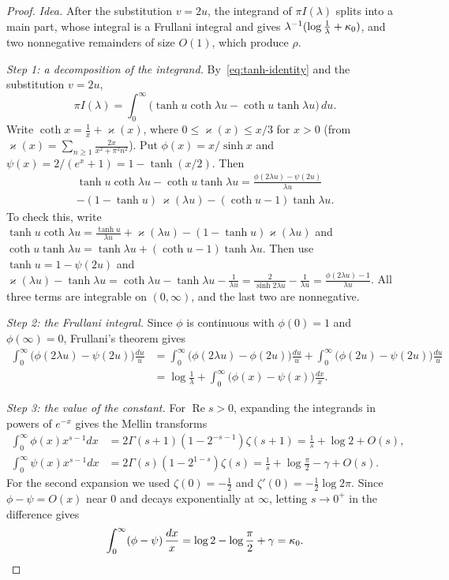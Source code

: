 \begin{proof}
\emph{Idea.} After the substitution $v=2u$, the integrand of $\pi I(\lambda)$ splits into a main part, whose integral is a Frullani integral and gives $\lambda^{-1}(\log\frac1\lambda+\kappa_0)$, and two nonnegative remainders of size $O(1)$, which produce $\rho$.

\emph{Step 1: a decomposition of the integrand.} By~\eqref{eq:tanh-identity} and the substitution $v=2u$,
\[
\pi I(\lambda)=\int_0^\infty\bigl(\tanh u\coth\lambda u-\coth u\tanh\lambda u\bigr)\,du.
\]
Write $\coth x=\frac1x+\varkappa(x)$, where $0\le\varkappa(x)\le x/3$ for $x>0$ (from $\varkappa(x)=\sum_{n\ge1}\frac{2x}{x^2+\pi^2n^2}$). Put $\phi(x)=x/\sinh x$ and $\psi(x)=2/(e^x+1)=1-\tanh(x/2)$. Then
\begin{multline*}
\tanh u\coth\lambda u-\coth u\tanh\lambda u
=\frac{\phi(2\lambda u)-\psi(2u)}{\lambda u}\\
-(1-\tanh u)\,\varkappa(\lambda u)-(\coth u-1)\tanh\lambda u.
\end{multline*}
To check this, write $\tanh u\coth\lambda u=\frac{\tanh u}{\lambda u}+\varkappa(\lambda u)-(1-\tanh u)\varkappa(\lambda u)$ and $\coth u\tanh\lambda u=\tanh\lambda u+(\coth u-1)\tanh\lambda u$. Then use $\tanh u=1-\psi(2u)$ and $\varkappa(\lambda u)-\tanh\lambda u=\coth\lambda u-\tanh\lambda u-\frac1{\lambda u}=\frac2{\sinh2\lambda u}-\frac1{\lambda u}=\frac{\phi(2\lambda u)-1}{\lambda u}$. All three terms are integrable on $(0,\infty)$, and the last two are nonnegative.

\emph{Step 2: the Frullani integral.} Since $\phi$ is continuous with $\phi(0)=1$ and $\phi(\infty)=0$, Frullani's theorem gives
\[
\begin{aligned}
\int_0^\infty\bigl(\phi(2\lambda u)-\psi(2u)\bigr)\frac{du}u&=\int_0^\infty\bigl(\phi(2\lambda u)-\phi(2u)\bigr)\frac{du}u+\int_0^\infty\bigl(\phi(2u)-\psi(2u)\bigr)\frac{du}u\\
&=\log\frac1\lambda+\int_0^\infty\bigl(\phi(x)-\psi(x)\bigr)\frac{dx}x.
\end{aligned}
\]

\emph{Step 3: the value of the constant.} For $\operatorname{Re}s>0$, expanding the integrands in powers of $e^{-x}$ gives the Mellin transforms
\begin{align*}
\int_0^\infty\phi(x)x^{s-1}dx&=2\Gamma(s+1)(1-2^{-s-1})\zeta(s+1)=\frac1s+\log2+O(s),\\
\int_0^\infty\psi(x)x^{s-1}dx&=2\Gamma(s)(1-2^{1-s})\zeta(s)=\frac1s+\log\frac\pi2-\gamma+O(s).
\end{align*}
For the second expansion we used $\zeta(0)=-\frac12$ and $\zeta'(0)=-\frac12\log2\pi$. Since $\phi-\psi=O(x)$ near $0$ and decays exponentially at $\infty$, letting $s\to0^+$ in the difference gives
\[
\int_0^\infty(\phi-\psi)\,\frac{dx}x=\log2-\log\frac\pi2+\gamma=\kappa_0.
\]


\end{proof}

